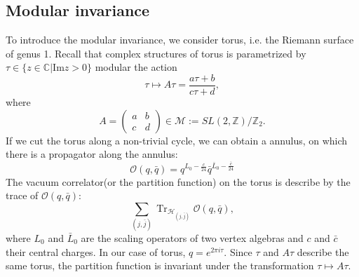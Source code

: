 \documentclass[10pt,reqno,draft]{article}
\numberwithin{equation}{section}
\numberwithin{figure}{section}
\numberwithin{table}{section}
\theoremstyle{plain}
\theoremstyle{definition}
\theoremstyle{remark}
\begin{document}
	\subsection{Modular invariance}
	To introduce the modular invariance, we consider torus, i.e. the Riemann surface of genus 1. Recall that complex structures of torus is parametrized by \(\tau\in \{z\in \mathbb{C}|\mathrm{Im} z>0\} \) modular the action 
	\begin{equation}
	  \tau\mapsto A\tau=\frac{a\tau+b}{c\tau+d},
	\end{equation}
	where
	\begin{equation}
	  A=\begin{pmatrix}
		  a & b \\
		  c & d	 
	  \end{pmatrix}
	  \in \mathcal{M}:=SL(2,\mathbb{Z})/\mathbb{Z}_{2}.
	\end{equation}
	If we cut the torus along a non-trivial cycle, we can obtain a annulus, on which there is a propagator along the annulus:
	\begin{equation}
		\mathcal{O}(q,\bar{q})=q^{L_{0}-\frac{c}{24}}\bar{q}^{\bar{L}_{0}-\frac{\bar{c}}{24}}
	\end{equation}
	The vacuum correlator(or the partition function) on the torus is describe by the trace of \(\mathcal{O}(q,\bar{q})\):
	\begin{equation}
		\sum_{(j,\bar{j})} \operatorname{Tr}_{\mathcal{H}_{(j,\bar{j})}}\mathcal{O}(q,\bar{q}),
	\end{equation}
	where \(L_0\) and \(\bar{L}_0\) are the scaling operators of two vertex algebras and \(c\) and \(\bar{c}\) their central charges. In our case of torus, \(q=e^{2\pi i\tau}\). Since \(\tau\) and \(A\tau\) describe the same torus, the partition function is invariant under the transformation \(\tau\mapsto A\tau\).
\end{document}
